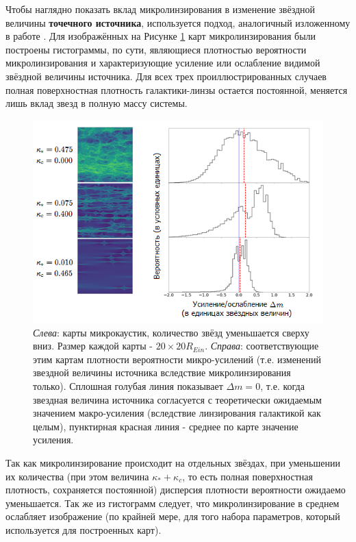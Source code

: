 Чтобы наглядно показать вклад микролинзирования в изменение звёздной величины \textbf{точечного источника}, используется подход, аналогичный изложенному в работе \cite{shwamb2002}. Для изображённых на Рисунке \ref{fig:histograms} карт микролинзирования были построены гистограммы, по сути, являющиеся плотностью вероятности микролинзирования и характеризующие усиление или ослабление видимой звёздной величины источника. Для всех трех проиллюстрированных случаев полная поверхностная плотность галактики-линзы остается постоянной, меняется лишь вклад звезд в полную массу системы.

\begin{figure}[H]
    \centering
	\includegraphics[scale=0.75]{pics/histograms.png}
	\caption{\textit{Слева}: карты микрокаустик, количество звёзд уменьшается сверху вниз. Размер каждой карты - $20 \times 20 R_{Ein}$. \textit{Справа}: соответствующие этим картам плотности вероятности микро-усилений (т.е. изменений звездной величины источника вследствие микролинзирования только). Сплошная голубая линия показывает $\Delta m=0$, т.е. когда звездная величина источника согласуется с теоретически ожидаемым значением макро-усиления (вследствие линзирования галактикой как целым), пунктирная красная линия - среднее по карте значение усиления. \label{fig:histograms}} 
\end{figure}

Так как микролинзирование происходит на отдельных звёздах, при уменьшении их количества (при этом величина $\kappa_*+\kappa_c$, то есть полная поверхностная плотность, сохраняется постоянной) дисперсия плотности вероятности ожидаемо уменьшается. Так же из гистограмм следует, что микролинзирование в среднем ослабляет изображение (по крайней мере, для того набора параметров, который используется для построенных карт). 
